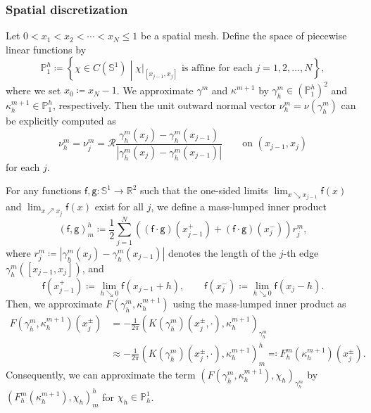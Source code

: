 \documentclass{article}
\theoremstyle{remark}
\theoremstyle{definition}
\newcommand{\relmiddle}[1]{\mathrel{}\middle#1\mathrel{}}
\numberwithin{equation}{section}
\begin{document}
\subsubsection{Spatial discretization}

Let $0 < x_1 < x_2 < \cdots < x_N \le 1$ be a spatial mesh.
Define the space of piecewise linear functions by
\begin{equation*}
    \mathbb{P}_1^h \coloneqq \left\{ \chi \in C(\mathbb{S}^1) \relmiddle| \text{$\chi|_{[x_{j-1}, x_j]}$ is affine for each } j = 1, 2, \ldots, N \right\},
\end{equation*}
where we set $x_0\coloneqq x_N-1$.
We approximate $\gamma^m$ and $\kappa^{m+1}$ by $\gamma_h^m \in (\mathbb{P}_1^h)^2$ and $\kappa_h^{m+1} \in \mathbb{P}_1^h$, respectively.
Then the unit outward normal vector $\nu_h^m = \nu(\gamma_h^m)$ can be explicitly computed as
\begin{equation*}
    \nu_h^m = \nu_j^m = \mathcal{R} \frac{\gamma_h^m(x_j) - \gamma_h^m(x_{j-1})}{|\gamma_h^m(x_j) - \gamma_h^m(x_{j-1})|} \qquad \text{on } (x_{j-1}, x_j)
\end{equation*}
for each $j$.

For any functions $\mathsf{f}, \mathsf{g} \colon \mathbb{S}^1 \to \mathbb{R}^2$ such that the one-sided limits $\lim_{x \searrow x_{j-1}} \mathsf{f}(x)$ and $\lim_{x \nearrow x_j} \mathsf{f}(x)$ exist for all $j$, we define a mass-lumped inner product
\begin{equation*}
    (\mathsf{f}, \mathsf{g})_m^h \coloneqq \frac{1}{2} \sum_{j=1}^N \left( (\mathsf{f} \cdot \mathsf{g})(x_{j-1}^+) + (\mathsf{f} \cdot \mathsf{g})(x_j^-) \right) r_j^m,
\end{equation*}
where $r_j^m \coloneqq |\gamma_h^m(x_j) - \gamma_h^m(x_{j-1})|$ denotes the length of the $j$-th edge $\gamma_h^m([x_{j-1}, x_j])$, and
\begin{equation*}
    \mathsf{f}(x_{j-1}^+) \coloneqq \lim_{h \searrow 0} \mathsf{f}(x_{j-1} + h), \qquad
    \mathsf{f}(x_j^-) \coloneqq \lim_{h \searrow 0} \mathsf{f}(x_j - h).
\end{equation*}
Then, we approximate $F(\gamma_h^m,\kappa_h^{m+1})$ using the mass-lumped inner product as
\begin{align*}
    F(\gamma_h^m,\kappa_h^{m+1})(x_j^\pm)
    &=-\frac{1}{2\pi}\left(K(\gamma_h^m)(x_j^\pm,\cdot),\kappa_h^{m+1}\right)_{\gamma_h^m} \\
    &\approx-\frac{1}{2\pi}\left(K(\gamma_h^m)(x_j^\pm,\cdot),\kappa_h^{m+1}\right)_m^h
    \eqqcolon F_h^m(\kappa_h^{m+1})(x_j^\pm).
\end{align*}
Consequently, we can approximate the term $(F(\gamma_h^m,\kappa_h^{m+1}),\chi_h)_{\gamma_h^m}$ by $(F_h^m(\kappa_h^{m+1}),\chi_h)_m^h$ for $\chi_h\in \mathbb{P}_h^1$.
\end{document}
